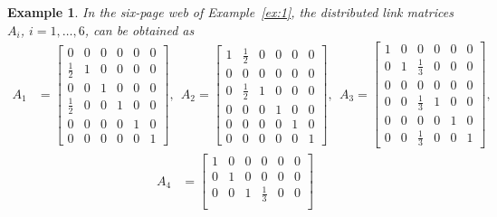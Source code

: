 \documentclass[11pt,draftcls,onecolumn]{IEEEtran}
\newtheorem{example}[theorem]{Example}
\begin{document}
\begin{example}\label{ex:3}\rm
In the six-page web of Example~\ref{ex:1}, 
the distributed link matrices $A_i$, $i=1,\ldots,6$, can be obtained as
\begin{align*}
A_1
  &= \begin{bmatrix}
       0           & 0 & 0           & 0 & 0 & 0\\
       \frac{1}{2} & 1 & 0           & 0 & 0 & 0\\
       0           & 0           & 1           & 0 & 0 & 0\\
       \frac{1}{2} & 0           & 0           & 1 & 0 & 0\\
       0           & 0           & 0           & 0 & 1 & 0\\
       0           & 0           & 0           & 0 & 0 & 1
     \end{bmatrix},~~
 A_2
  = \begin{bmatrix}
       1 &  \frac{1}{2}& 0           & 0 & 0 & 0\\
       0 & 0           &   0& 0 & 0 & 0\\
       0           &  \frac{1}{2}& 1 & 0 & 0 & 0\\
       0           & 0           & 0           & 1 & 0 & 0\\
       0           & 0           & 0           & 0 & 1 & 0\\
       0           & 0           & 0           & 0 & 0 & 1
     \end{bmatrix},~~
 A_3
  = \begin{bmatrix}
       1 & 0 & 0           & 0           & 0 & 0\\
       0 & 1           & \frac{1}{3} & 0           & 0 & 0\\
       0 & 0 & 0           & 0 & 0 & 0\\
       0 & 0           & \frac{1}{3} & 1 & 0 & 0\\
       0 & 0           & 0           & 0           & 1 & 0\\
       0 & 0           & \frac{1}{3} & 0           & 0 & 1
     \end{bmatrix},
\end{align*}
\begin{align*}
A_4
  &= \begin{bmatrix}
       1           & 0 & 0           & 0 & 0 & 0\\
       0 & 1 & 0           & 0 & 0 & 0\\
       0           &   0         & 1           &  \frac{1}{3} & 0 & 0\\

\end{bmatrix}
\end{align*}
\end{example}
\end{document}
